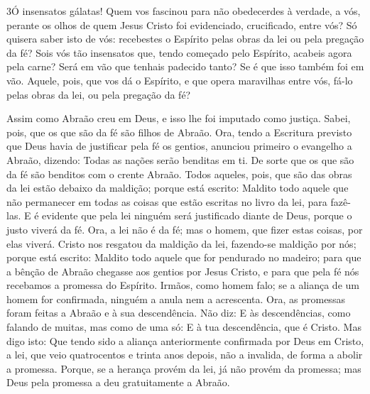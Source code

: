 \medskip

\lettrine{3} Ó insensatos gálatas! Quem vos fascinou para não
obedecerdes à verdade, a vós, perante os olhos de quem Jesus Cristo
foi evidenciado, crucificado, entre vós? Só quisera saber isto
de vós: recebestes o Espírito pelas obras da lei ou pela pregação da
fé? Sois vós tão insensatos que, tendo começado pelo Espírito,
acabeis agora pela carne? Será em vão que tenhais padecido
tanto? Se é que isso também foi em vão. Aquele, pois, que vos dá
o Espírito, e que opera maravilhas entre vós, fá-lo pelas obras da
lei, ou pela pregação da fé?

Assim como Abraão creu em Deus, e isso lhe foi imputado como
justiça. Sabei, pois, que os que são da fé são filhos de Abraão.
Ora, tendo a Escritura previsto que Deus havia de justificar
pela fé os gentios, anunciou primeiro o evangelho a Abraão, dizendo:
Todas as nações serão benditas em ti. De sorte que os que são da
fé são benditos com o crente Abraão. Todos aqueles, pois, que
são das obras da lei estão debaixo da maldição; porque está escrito:
Maldito todo aquele que não permanecer em todas as coisas que estão
escritas no livro da lei, para fazê-las. E é evidente que
pela lei ninguém será justificado diante de Deus, porque o justo
viverá da fé. Ora, a lei não é da fé; mas o homem, que fizer
estas coisas, por elas viverá. Cristo nos resgatou da
maldição da lei, fazendo-se maldição por nós; porque está escrito:
Maldito todo aquele que for pendurado no madeiro; para que a
bênção de Abraão chegasse aos gentios por Jesus Cristo, e para que
pela fé nós recebamos a promessa do Espírito. Irmãos, como
homem falo; se a aliança de um homem for confirmada, ninguém a anula
nem a acrescenta. Ora, as promessas foram feitas a Abraão e à
sua descendência. Não diz: E às descendências, como falando de
muitas, mas como de uma só: E à tua descendência, que é Cristo.
Mas digo isto: Que tendo sido a aliança anteriormente
confirmada por Deus em Cristo, a lei, que veio quatrocentos e trinta
anos depois, não a invalida, de forma a abolir a promessa.
Porque, se a herança provém da lei, já não provém da
promessa; mas Deus pela promessa a deu gratuitamente a Abraão.

